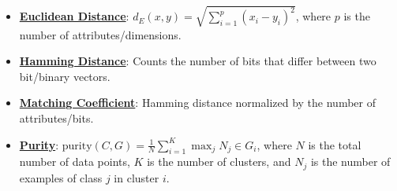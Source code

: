 \documentclass{article}%
\begin{document}
\begin{itemize}[leftmargin=*]%
\item \href{https://purdue.brightspace.com/d2l/common/assets/pdfjs-d2l-dist/1.0.14-legacy/web/viewer.html?file=\%2Fcontent\%2Fenforced\%2F1095467-wl.202510.CS.24300.001\%2F12L2-distance-clusters.pdf\%3Fou\%3D1095467\&lang=en-us\&container=d2l-fileviewer-rendered-pdf\&fullscreen=d2l-fileviewer-rendered-pdf-dialog\&height=667#page=17}{\textbf{Euclidean Distance}}: $d_E(x, y) = \sqrt{\sum_{i=1}^{p} (x_i - y_i)^2}$, where $p$ is the number of attributes/dimensions.%
\item \href{https://purdue.brightspace.com/d2l/common/assets/pdfjs-d2l-dist/1.0.14-legacy/web/viewer.html?file=\%2Fcontent\%2Fenforced\%2F1095467-wl.202510.CS.24300.001\%2F12L2-distance-clusters.pdf\%3Fou\%3D1095467\&lang=en-us\&container=d2l-fileviewer-rendered-pdf\&fullscreen=d2l-fileviewer-rendered-pdf-dialog\&height=667#page=19}{\textbf{Hamming Distance}}: Counts the number of bits that differ between two bit/binary vectors.%
\item \href{https://purdue.brightspace.com/d2l/common/assets/pdfjs-d2l-dist/1.0.14-legacy/web/viewer.html?file=\%2Fcontent\%2Fenforced\%2F1095467-wl.202510.CS.24300.001\%2F12L2-distance-clusters.pdf\%3Fou\%3D1095467\&lang=en-us\&container=d2l-fileviewer-rendered-pdf\&fullscreen=d2l-fileviewer-rendered-pdf-dialog\&height=667#page=19}{\textbf{Matching Coefficient}}: Hamming distance normalized by the number of attributes/bits.%
\item \href{https://purdue.brightspace.com/d2l/common/assets/pdfjs-d2l-dist/1.0.14-legacy/web/viewer.html?file=\%2Fcontent\%2Fenforced\%2F1095467-wl.202510.CS.24300.001\%2F12L2-distance-clusters.pdf\%3Fou\%3D1095467\&lang=en-us\&container=d2l-fileviewer-rendered-pdf\&fullscreen=d2l-fileviewer-rendered-pdf-dialog\&height=667#page=44}{\textbf{Purity}}: $\text{purity}(C, G) = \frac{1}{N} \sum_{i=1}^{K} \max_j N_j \in G_i$, where $N$ is the total number of data points, $K$ is the number of clusters, and $N_j$ is the number of examples of class $j$ in cluster $i$.%
\end{itemize}%
\end{document}
